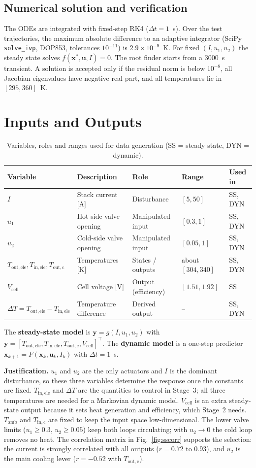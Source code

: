 \documentclass[11pt,a4paper]{article}
\newcommand{\Tout}{T_{\mathrm{out,ele}}}
\newcommand{\Tin}{T_{\mathrm{in,ele}}}
\newcommand{\Tc}{T_{\mathrm{out,c}}}
\newcommand{\Vcell}{V_{\mathrm{cell}}}
\newcommand{\dT}{\Delta T}
\begin{document}
\subsection{Numerical solution and verification}
The ODEs are integrated with fixed-step RK4 ($\Delta t=1$~s). Over the test trajectories, the maximum absolute difference to an adaptive integrator (SciPy \texttt{solve\_ivp}, DOP853, tolerances $10^{-11}$) is $2.9\times10^{-9}$~K. For fixed $(I,u_1,u_2)$ the steady state solves $f(\bm x^\ast,\bm u,I)=0$. The root finder starts from a 3000~s transient. A solution is accepted only if the residual norm is below $10^{-8}$, all Jacobian eigenvalues have negative real part, and all temperatures lie in $[295,360]$~K.

\section{Inputs and Outputs}
\begin{table}[H]
\centering\small
\caption{Variables, roles and ranges used for data generation (SS = steady state, DYN = dynamic).}\label{tab:vars}
\begin{tabular}{lllll}
\toprule
Variable & Description & Role & Range & Used in \\
\midrule
$I$ & Stack current [A] & Disturbance & $[5,50]$ & SS, DYN \\
$u_1$ & Hot-side valve opening & Manipulated input & $[0.3,1]$ & SS, DYN \\
$u_2$ & Cold-side valve opening & Manipulated input & $[0.05,1]$ & SS, DYN \\
$\Tout,\Tin,\Tc$ & Temperatures [K] & States / outputs & about $[304,340]$ & SS, DYN \\
$\Vcell$ & Cell voltage [V] & Output (efficiency) & $[1.51,1.92]$ & SS \\
$\dT=\Tout-\Tin$ & Temperature difference & Derived output & -- & SS, DYN \\
\bottomrule
\end{tabular}
\end{table}
The \textbf{steady-state model} is $\bm y=g(I,u_1,u_2)$ with $\bm y=[\Tout,\Tin,\Tc,\Vcell]^{\top}$. The \textbf{dynamic model} is a one-step predictor $\bm x_{k+1}=F(\bm x_k,\bm u_k,I_k)$ with $\Delta t=1$~s.

\textbf{Justification.} $u_1$ and $u_2$ are the only actuators and $I$ is the dominant disturbance, so these three variables determine the response once the constants are fixed. $\Tin$ and $\dT$ are the quantities to control in Stage~3; all three temperatures are needed for a Markovian dynamic model. $\Vcell$ is an extra steady-state output because it sets heat generation and efficiency, which Stage~2 needs. $T_{\mathrm{amb}}$ and $T_{\mathrm{in,c}}$ are fixed to keep the input space low-dimensional. The lower valve limits ($u_1\ge0.3$, $u_2\ge0.05$) keep both loops circulating; with $u_2\to0$ the cold loop removes no heat. The correlation matrix in Fig.~\ref{fig:sscorr} supports the selection: the current is strongly correlated with all outputs ($r=0.72$ to $0.93$), and $u_2$ is the main cooling lever ($r=-0.52$ with $\Tc$).
\end{document}
